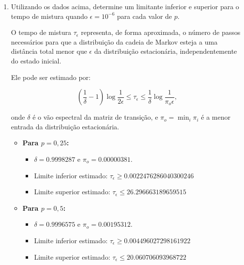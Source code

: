 \begin{enumerate}
\begin{resposta}
    \end{resposta}

    \newpage
    \item Utilizando os dados acima, determine um limitante inferior e superior para o tempo de mistura quando $\epsilon = 10^{-6}$ para cada valor de $p$.
    \begin{resposta}
        O tempo de mistura $\tau_\epsilon$ representa, de forma aproximada, o número de passos necessários para que a distribuição da cadeia de Markov esteja a uma distância total menor que $\epsilon$ da distribuição estacionária, independentemente do estado inicial.
        
        Ele pode ser estimado por:
        
        $$ \left( \frac{1}{\delta} - 1 \right) \log \frac{1}{2\epsilon} \leq \tau_\epsilon \leq \frac{1}{\delta} \log \frac{1}{\pi_o \epsilon}, $$
        
        onde $\delta$ é o vão espectral da matriz de transição, e $\pi_o = \min_i \pi_i$ é a menor entrada da distribuição estacionária.
        
        \begin{itemize}
            \item \textbf{Para $p = 0{,}25$:}
            \begin{itemize}
                \item $\delta = 0.9998287$ e $\pi_o = 0.00000381$.
                \item Limite inferior estimado:
                $ \boxed{\tau_\epsilon \geq 0.0022476286040300246} $
                \item Limite superior estimado:
                $ \boxed{\tau_\epsilon \leq 26.296663189659515} $
            \end{itemize}
        
            \item \textbf{Para $p = 0{,}5$:}
            \begin{itemize}
                \item $\delta = 0.9996575$ e $\pi_o = 0.00195312$.
                \item Limite inferior estimado:
                $ \boxed{\tau_\epsilon \geq 0.004496027298161922} $
                \item Limite superior estimado:
                $ \boxed{\tau_\epsilon \leq 20.060706093968722} $
            \end{itemize}
        

\end{itemize}
\end{resposta}
\end{enumerate}

